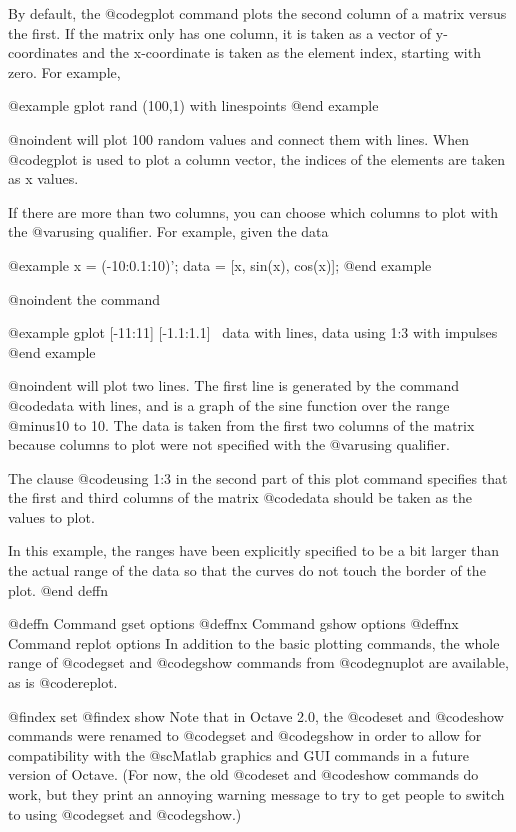 By default, the @code{gplot} command plots the second column of a matrix
versus the first.  If the matrix only has one column, it is taken as a
vector of y-coordinates and the x-coordinate is taken as the element
index, starting with zero.  For example,

@example
gplot rand (100,1) with linespoints
@end example

@noindent
will plot 100 random values and connect them with lines.  When
@code{gplot} is used to plot a column vector, the indices of the
elements are taken as x values.

  If there are more than two columns, you can
choose which columns to plot with the @var{using} qualifier. For
example, given the data

@example
x = (-10:0.1:10)';
data = [x, sin(x), cos(x)];
@end example

@noindent
the command

@example
gplot [-11:11] [-1.1:1.1] \
  data with lines, data using 1:3 with impulses
@end example

@noindent
will plot two lines.  The first line is generated by the command
@code{data with lines}, and is a graph of the sine function over the
range @minus{}10 to 10.  The data is taken from the first two columns of
the matrix because columns to plot were not specified with the
@var{using} qualifier.

The clause @code{using 1:3} in the second part of this plot command
specifies that the first and third columns of the matrix @code{data}
should be taken as the values to plot.

In this example, the ranges have been explicitly specified to be a bit
larger than the actual range of the data so that the curves do not touch
the border of the plot.
@end deffn

@deffn {Command} gset options
@deffnx {Command} gshow options
@deffnx {Command} replot options
In addition to the basic plotting commands, the whole range of
@code{gset} and @code{gshow} commands from @code{gnuplot} are available,
as is @code{replot}.

@findex set
@findex show
Note that in Octave 2.0, the @code{set} and @code{show} commands were
renamed to @code{gset} and @code{gshow} in order to allow for
compatibility with the @sc{Matlab} graphics and GUI commands in a future
version of Octave.  (For now, the old @code{set} and @code{show}
commands do work, but they print an annoying warning message to try to
get people to switch to using @code{gset} and @code{gshow}.)


